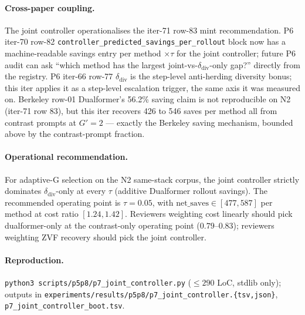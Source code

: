 \paragraph{Cross-paper coupling.}
The joint controller operationalises the iter-71 row-83 mint
recommendation. P6 iter-70 row-82
\texttt{controller\_predicted\_savings\_per\_rollout} block now has a
machine-readable savings entry per method $\times \tau$ for the joint
controller; future P6 audit can ask ``which method has the largest
joint-vs-$\delta_{\mathrm{div}}$-only gap?'' directly from the
registry. P6 iter-66 row-77 $\delta_{\mathrm{div}}$ is the step-level
anti-herding diversity bonus; this iter applies it as a step-level
escalation trigger, the same axis it was measured on. Berkeley row-01
Dualformer's 56.2\% saving claim is not reproducible on N2 (iter-71
row 83), but this iter recovers 426 to 546 saves per method all from
contrast prompts at $G'{=}2$ — exactly the Berkeley saving mechanism,
bounded above by the contrast-prompt fraction.

\paragraph{Operational recommendation.}
For adaptive-G selection on the N2 same-stack corpus, the joint
controller strictly dominates $\delta_{\mathrm{div}}$-only at every
$\tau$ (additive Dualformer rollout savings). The recommended
operating point is $\tau{=}0.05$, with $\mathrm{net\_saves} \in [477,
587]$ per method at cost ratio $[1.24, 1.42]$. Reviewers weighting
cost linearly should pick dualformer-only at the contrast-only
operating point ($0.79$–$0.83$); reviewers weighting ZVF recovery
should pick the joint controller.

\paragraph{Reproduction.}
\texttt{python3 scripts/p5p8/p7\_joint\_controller.py}
($\leq 290$ LoC, stdlib only); outputs in
\texttt{experiments/results/p5p8/p7\_joint\_controller.\{tsv,json\}},
\texttt{p7\_joint\_controller\_boot.tsv}.
